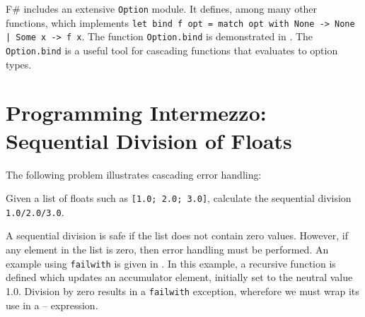 \documentclass[fsharpnotes.tex]{subfiles}
\begin{document}
F\# includes an extensive \lstinline{Option} module. It defines, among many other functions,  which implements \lstinline{let bind f opt = match opt with None -> None | Some x -> f x}. The function \lstinline{Option.bind} is demonstrated in .
%
%
The \lstinline{Option.bind} is a useful tool for cascading functions that evaluates to option types.

\section{Programming Intermezzo: Sequential Division of Floats}
The following problem illustrates cascading error handling:
\begin{problem}
  Given a list of floats such as \lstinline{[1.0; 2.0; 3.0]}, calculate the sequential division \lstinline{1.0/2.0/3.0}. 
\end{problem}
A sequential division is safe if the list does not contain zero values. However, if any element in the list is zero, then error handling must be performed. An example using \lstinline{failwith} is given in .
%
%
In this example, a recursive function is defined which updates an accumulator element, initially set to the neutral value 1.0. Division by zero results in a \lstinline{failwith} exception, wherefore we must wrap its use in a -- expression.
\end{document}
